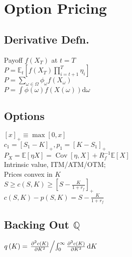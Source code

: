\section{Option Pricing}
	\subsection*{Derivative Defn.}
	Payoff $f\left(X_{T}\right)$ at $t = T$\\
	$P = \mathbb{E}_{t}\left[f\left(X_{T}\right)\prod_{i = t + 1}^{T}\eta_{i}\right]$\\
	$P = \sum_{\omega\in\Omega}\phi_{\omega}f\left(X_{\omega}\right)$\\
	$P = \int\phi\left(\omega\right)f\left(X\left(\omega\right)\right)\mathrm{d}\omega$
	
	\subsection*{Options}
	$\left[x\right]_{+}\equiv\max\left[0, x\right]$\\
	$c_{1} = \left[S_{1} - K\right]_{+}, p_{1} = \left[K - S_{1}\right]_{+}$\\
	$P_{X} = \mathbb{E}\left[\eta X\right] = \operatorname{Cov}\left[\eta, X\right] + R_{f}^{-1}\mathbb{E}\left[X\right]$\\
	Intrinsic value, ITM/ATM/OTM;\\
	Prices convex in $K$\\
	$S\geq c\left(S, K\right)\geq\left[S - \frac{K}{1 + r_{f}}\right]_{+}$\\
	$c\left(S, K\right) - p\left(S, K\right) = S - \frac{K}{1 + r_{f}}$\\
	
	\subsection*{Backing Out $\mathbb{Q}$}
	$q\left(K\right) = \left.\frac{\partial^{2}c(K)}{\partial K^{2}}\middle/\int_{0}^{\infty}\frac{\partial^{2}c(K)}{\partial K^{2}}\,\mathrm{d}K\right.$
	